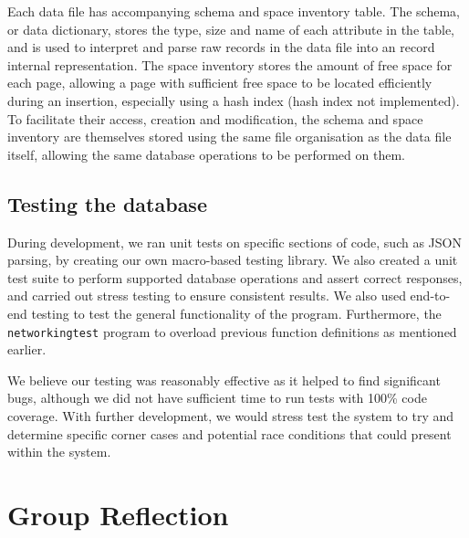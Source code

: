\documentclass[11pt]{article}
\begin{document}
Each data file has accompanying schema and space inventory table. The schema, or data dictionary, stores the type, size and name of each attribute in the table, and is used to interpret and parse raw records in the data file into an record internal representation. The space inventory stores the amount of free space for each page, allowing a page with sufficient free space to be located efficiently during an insertion, especially using a hash index (hash index not implemented). To facilitate their access, creation and modification, the schema and space inventory are themselves stored using the same file organisation as the data file itself, allowing the same database operations to be performed on them.

\subsection{Testing the database}
During development, we ran unit tests on specific sections of code, such as JSON parsing, by creating our own macro-based testing library. We also created a unit test suite to perform supported database operations and assert correct responses, and carried out stress testing to ensure consistent results. We also used end-to-end testing to test the general functionality of the program. Furthermore, the \texttt{networkingtest} program to overload previous function definitions as mentioned earlier.

We believe our testing was reasonably effective as it helped to find significant bugs, although we did not have sufficient time to run tests with 100\% code coverage. With further development, we would stress test the system to try and determine specific corner cases and potential race conditions that could present within the system.

\section{Group Reflection}
\end{document}
